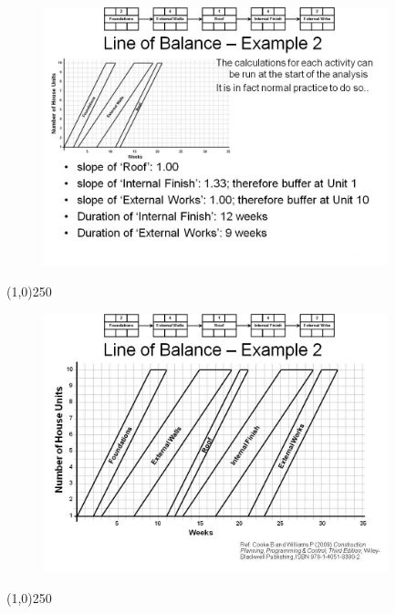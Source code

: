 \begin{frame}
\begin{figure}
	\centering
		\includegraphics[width = 10.0cm]{oldnotes/Slide264.jpg}
\end{figure}
\end{frame}
\begin{center}\line(1,0){250}\end{center}






\begin{frame}
\begin{figure}
	\centering
		\includegraphics[width = 10.0cm]{oldnotes/Slide265.jpg}
\end{figure}
\end{frame}
\begin{center}\line(1,0){250}\end{center}






